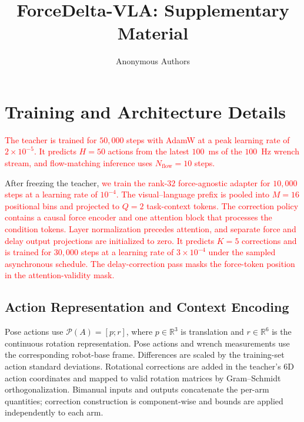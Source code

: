 \documentclass[conference]{IEEEtran}
\title{ForceDelta-VLA: Supplementary Material}
\author{Anonymous Authors}
\newcommand{\assumed}[1]{\textcolor{red}{#1}}
\begin{document}
\maketitle

\section{Training and Architecture Details}

\assumed{The teacher is trained for $50{,}000$ steps with AdamW at a peak learning rate of $2\times10^{-5}$. It predicts $H{=}50$ actions from the latest $100$~ms of the $100$~Hz wrench stream, and flow-matching inference uses $N_{\mathrm{flow}}{=}10$ steps.}

After freezing the teacher, \assumed{we train the rank-$32$ force-agnostic adapter for $10{,}000$ steps at a learning rate of $10^{-4}$. The visual--language prefix is pooled into $M{=}16$ positional bins and projected to $Q{=}2$ task-context tokens. The correction policy contains a causal force encoder and one attention block that processes the condition tokens. Layer normalization precedes attention, and separate force and delay output projections are initialized to zero. It predicts $K{=}5$ corrections and is trained for $30{,}000$ steps at a learning rate of $3\times10^{-4}$ under the sampled asynchronous schedule. The delay-correction pass masks the force-token position in the attention-validity mask.}

\subsection{Action Representation and Context Encoding}

Pose actions use $\mathcal P(A)=[p;r]$, where $p\in\mathbb R^3$ is translation and $r\in\mathbb R^6$ is the continuous rotation representation. Pose actions and wrench measurements use the corresponding robot-base frame. Differences are scaled by the training-set action standard deviations. Rotational corrections are added in the teacher's 6D action coordinates and mapped to valid rotation matrices by Gram--Schmidt orthogonalization. Bimanual inputs and outputs concatenate the per-arm quantities; correction construction is component-wise and bounds are applied independently to each arm.
\end{document}
